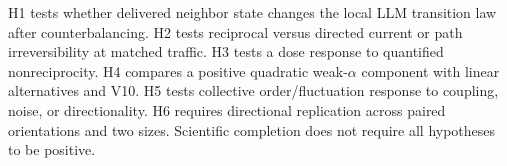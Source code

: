 \documentclass[12pt]{article}
\begin{document}
H1 tests whether delivered neighbor state changes the local LLM transition law
after counterbalancing. H2 tests reciprocal versus directed current or path
irreversibility at matched traffic. H3 tests a dose response to quantified
nonreciprocity. H4 compares a positive quadratic weak-$\alpha$ component with
linear alternatives and V10. H5 tests collective order/fluctuation response to
coupling, noise, or directionality. H6 requires directional replication across
paired orientations and two sizes. Scientific completion does not require all
hypotheses to be positive.



\end{document}
